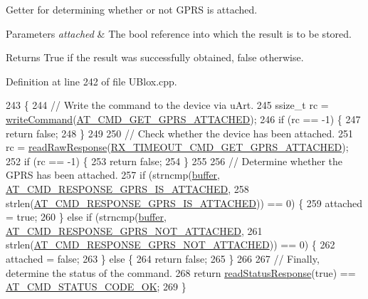 Getter for determining whether or not G\+P\+RS is attached.


\begin{DoxyParams}{Parameters}
{\em attached} & The bool reference into which the result is to be stored. \\
\hline
\end{DoxyParams}
\begin{DoxyReturn}{Returns}
True if the result was successfully obtained, false otherwise. 
\end{DoxyReturn}


Definition at line 242 of file U\+Blox.\+cpp.


\begin{DoxyCode}
243 \{
244     \textcolor{comment}{// Write the command to the device via uArt.}
245     ssize\_t rc = \hyperlink{class_u_blox_af604d1897a66192bf1c2a11997f2634d}{writeCommand}(\hyperlink{_u_blox_8cpp_ac20e914a12b5d6dccbc1f39b1d19d57d}{AT\_CMD\_GET\_GPRS\_ATTACHED});
246     \textcolor{keywordflow}{if} (rc == -1) \{
247         \textcolor{keywordflow}{return} \textcolor{keyword}{false};
248     \}
249 
250     \textcolor{comment}{// Check whether the device has been attached.}
251     rc = \hyperlink{class_u_blox_ab4a7ab4b8922d91e23f273ae160c1bed}{readRawResponse}(\hyperlink{_u_blox_8cpp_a9dbe91fbc54af4d1d428ac0baa6dce8c}{RX\_TIMEOUT\_CMD\_GET\_GPRS\_ATTACHED});
252     \textcolor{keywordflow}{if} (rc == -1) \{
253         \textcolor{keywordflow}{return} \textcolor{keyword}{false};
254     \}
255 
256     \textcolor{comment}{// Determine whether the GPRS has been attached.}
257     \textcolor{keywordflow}{if} (strncmp(\hyperlink{class_u_blox_a6ca4b90f3dc4e856181dce1ebda6f82c}{buffer}, \hyperlink{_u_blox_8cpp_aa122c9762862e45d9186ed3e22b0f593}{AT\_CMD\_RESPONSE\_GPRS\_IS\_ATTACHED},
258                 strlen(\hyperlink{_u_blox_8cpp_aa122c9762862e45d9186ed3e22b0f593}{AT\_CMD\_RESPONSE\_GPRS\_IS\_ATTACHED})) == 0) \{
259         attached = \textcolor{keyword}{true};
260     \} \textcolor{keywordflow}{else} \textcolor{keywordflow}{if} (strncmp(\hyperlink{class_u_blox_a6ca4b90f3dc4e856181dce1ebda6f82c}{buffer}, \hyperlink{_u_blox_8cpp_aa030b5e1c7188bb8b077579489537b95}{AT\_CMD\_RESPONSE\_GPRS\_NOT\_ATTACHED},
261                        strlen(\hyperlink{_u_blox_8cpp_aa030b5e1c7188bb8b077579489537b95}{AT\_CMD\_RESPONSE\_GPRS\_NOT\_ATTACHED})) == 0) \{
262         attached = \textcolor{keyword}{false};
263     \} \textcolor{keywordflow}{else} \{
264         \textcolor{keywordflow}{return} \textcolor{keyword}{false};
265     \}
266 
267     \textcolor{comment}{// Finally, determine the status of the command.}
268     \textcolor{keywordflow}{return} \hyperlink{class_u_blox_a4eaca5b1b1c4b5b6f6164b220dd43e0b}{readStatusResponse}(\textcolor{keyword}{true}) == \hyperlink{_u_blox_8cpp_a6ebc1682eb6b9964fccb4a61688ff307}{AT\_CMD\_STATUS\_CODE\_OK};
269 \}
\end{DoxyCode}
